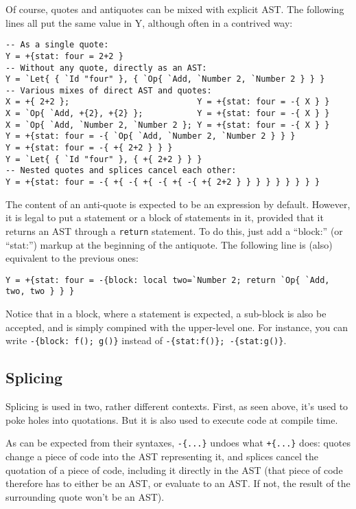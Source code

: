 Of course, quotes and antiquotes can be mixed with explicit AST. The
following lines all put the same value in Y, although often in a
contrived way:

\begin{verbatim}
-- As a single quote:
Y = +{stat: four = 2+2 }
-- Without any quote, directly as an AST:
Y = `Let{ { `Id "four" }, { `Op{ `Add, `Number 2, `Number 2 } } }
-- Various mixes of direct AST and quotes:
X = +{ 2+2 };                          Y = +{stat: four = -{ X } }
X = `Op{ `Add, +{2}, +{2} };           Y = +{stat: four = -{ X } }
X = `Op{ `Add, `Number 2, `Number 2 }; Y = +{stat: four = -{ X } }
Y = +{stat: four = -{ `Op{ `Add, `Number 2, `Number 2 } } }
Y = +{stat: four = -{ +{ 2+2 } } }
Y = `Let{ { `Id "four" }, { +{ 2+2 } } }
-- Nested quotes and splices cancel each other:
Y = +{stat: four = -{ +{ -{ +{ -{ +{ -{ +{ 2+2 } } } } } } } } }
\end{verbatim}

The content of an anti-quote is expected to be an expression by
default. However, it is legal to put a statement or a block of
statements in it, provided that it returns an AST through a
\verb+return+ statement. To do this, just add a ``block:''
(or ``stat:'') markup at the beginning of the antiquote. The
following line is (also) equivalent to the previous ones:

\begin{verbatim}
Y = +{stat: four = -{block: local two=`Number 2; return `Op{ `Add, two, two } } }
\end{verbatim}

Notice that in a block, where a statement is expected, a sub-block is
also be accepted, and is simply compined with the upper-level one. For
instance, you can write \verb|-{block: f(); g()}| instead of
\verb|-{stat:f()}; -{stat:g()}|.

\subsection{Splicing}
Splicing is used in two, rather different contexts. First, as seen
above, it's used to poke holes into quotations. But it is also used to
execute code at compile time.

As can be expected from their syntaxes, \verb|-{...}| undoes what
\verb|+{...}| does: quotes change a piece of code into the AST
representing it, and splices cancel the quotation of a piece of code,
including it directly in the AST (that piece of code therefore has to
either be an AST, or evaluate to an AST. If not, the result of the
surrounding quote won't be an AST).

